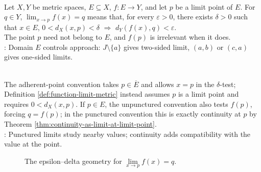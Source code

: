 \begin{definition} \label{def:function-limit-metric}\label{def:continuity-core-definitions-source-todo} \\
Let $X,Y$ be metric spaces, $E\subseteq X$, $f:E\to Y$, and let $p$ be a limit point of $E$. For $q\in Y$, $\lim_{x\to p} f(x)=q$ means that, for every $\varepsilon>0$, there exists $\delta>0$ such that $x\in E$, $0<d_X(x,p)<\delta$ $\Longrightarrow$ $d_Y(f(x),q)<\varepsilon$.\\
The point $p$ need not belong to $E$, and $f(p)$ is irrelevant when it does.\\
: Domain $E$ controls approach: $J\setminus\{a\}$ gives two-sided limit,  $(a,b)$ or $(c,a)$ gives one-sided limits.
\end{definition}

\begin{remark} \label{rem:adherent-function-limits-convention} \\
The adherent-point convention takes $p\in\overline{E}$ and allows $x=p$ in the $\delta$-test; Definition \ref{def:function-limit-metric} instead assumes $p$ is a limit point and requires $0<d_X(x,p)$. If $p\in E$, the unpunctured convention also tests $f(p)$, forcing $q=f(p)$; in the punctured convention this is exactly continuity at $p$ by Theorem \ref{thm:continuity-as-limit-at-limit-point}.\\
: Punctured limits study nearby values; continuity adds compatibility with the value at the point.
\end{remark}

\begin{figure}[H]
  \centering
  
  \caption{The epsilon--delta geometry for \(\lim\limits_{x\to p} f(x)=q\).}
  \label{fig:function-limit-epsilon-delta}
\end{figure}

